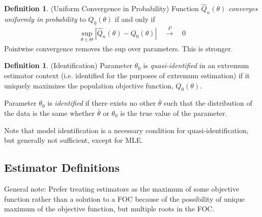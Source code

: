 \documentclass[12pt]{article}
\theoremstyle{plain}
\theoremstyle{definition}
\newtheorem{defn}[thm]{Definition}
\theoremstyle{remark}
\newcommand{\pto}{\xrightarrow{P}}
\begin{document}
\begin{defn}(Uniform Convergence in Probability)
Function $\widehat{Q}_n(\theta)$
\emph{converges uniformly in probability}
to $Q_0(\theta)$ if and only if
\begin{align*}
  \sup_{\theta\in\Theta}
  |\widehat{Q}_n(\theta)-Q_0(\theta)|
  \quad\pto\quad
  0
\end{align*}
Pointwise convergence removes the sup over parameters. This is stronger.
\end{defn}


\begin{defn}(Identification)
Parameter $\theta_0$ is \emph{quasi-identified} in an extremum estimator
context (i.e. identified for the purposes of extremum estimation) if it
uniquely maximizes the population objective function, $Q_0(\theta)$.

Parameter $\theta_0$ is \emph{identified} if there exists no other
$\bar{\theta}$ such that the distribution of the data is the same
whether $\bar{\theta}$ or $\theta_0$ is the true value of the parameter.

Note that model identification is a necessary condition for
quasi-identification, but generally not sufficient, except for MLE.
\end{defn}


\subsection{Estimator Definitions}


General note:
Prefer treating estimators as the maximum of some objective function
rather than a solution to a FOC because of the possibility of unique
maximum of the objective function, but multiple roots in the FOC.
\end{document}
